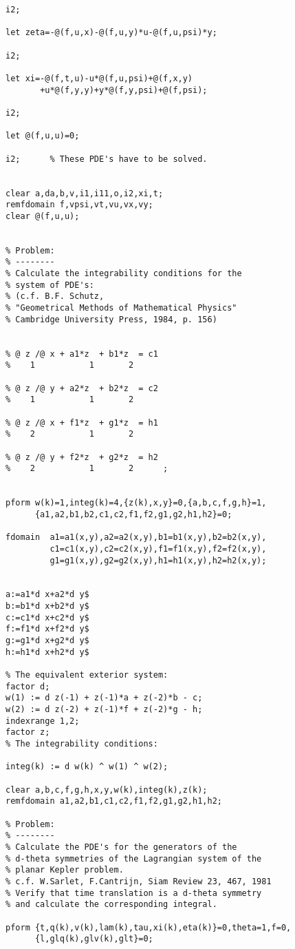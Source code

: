 {\begin{verbatim}
i2;

let zeta=-@(f,u,x)-@(f,u,y)*u-@(f,u,psi)*y;

i2;

let xi=-@(f,t,u)-u*@(f,u,psi)+@(f,x,y)
       +u*@(f,y,y)+y*@(f,y,psi)+@(f,psi);

i2;

let @(f,u,u)=0;

i2;      % These PDE's have to be solved.


clear a,da,b,v,i1,i11,o,i2,xi,t;
remfdomain f,vpsi,vt,vu,vx,vy;
clear @(f,u,u);


% Problem:
% --------
% Calculate the integrability conditions for the
% system of PDE's:
% (c.f. B.F. Schutz,
% "Geometrical Methods of Mathematical Physics"
% Cambridge University Press, 1984, p. 156)


% @ z /@ x + a1*z  + b1*z  = c1
%    1           1       2

% @ z /@ y + a2*z  + b2*z  = c2
%    1           1       2

% @ z /@ x + f1*z  + g1*z  = h1
%    2           1       2

% @ z /@ y + f2*z  + g2*z  = h2
%    2           1       2      ;


pform w(k)=1,integ(k)=4,{z(k),x,y}=0,{a,b,c,f,g,h}=1,
      {a1,a2,b1,b2,c1,c2,f1,f2,g1,g2,h1,h2}=0;

fdomain  a1=a1(x,y),a2=a2(x,y),b1=b1(x,y),b2=b2(x,y),
         c1=c1(x,y),c2=c2(x,y),f1=f1(x,y),f2=f2(x,y),
         g1=g1(x,y),g2=g2(x,y),h1=h1(x,y),h2=h2(x,y);


a:=a1*d x+a2*d y$
b:=b1*d x+b2*d y$
c:=c1*d x+c2*d y$
f:=f1*d x+f2*d y$
g:=g1*d x+g2*d y$
h:=h1*d x+h2*d y$

% The equivalent exterior system:
factor d;
w(1) := d z(-1) + z(-1)*a + z(-2)*b - c;
w(2) := d z(-2) + z(-1)*f + z(-2)*g - h;
indexrange 1,2;
factor z;
% The integrability conditions:

integ(k) := d w(k) ^ w(1) ^ w(2);

clear a,b,c,f,g,h,x,y,w(k),integ(k),z(k);
remfdomain a1,a2,b1,c1,c2,f1,f2,g1,g2,h1,h2;

% Problem:
% --------
% Calculate the PDE's for the generators of the
% d-theta symmetries of the Lagrangian system of the
% planar Kepler problem.
% c.f. W.Sarlet, F.Cantrijn, Siam Review 23, 467, 1981
% Verify that time translation is a d-theta symmetry
% and calculate the corresponding integral.

pform {t,q(k),v(k),lam(k),tau,xi(k),eta(k)}=0,theta=1,f=0,
      {l,glq(k),glv(k),glt}=0;


\end{verbatim}}
